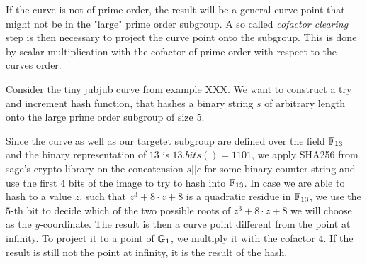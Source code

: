 If the curve is not of prime order, the result will be a general curve point that might not be in the "large" prime order subgroup. A so called \textit{cofactor clearing} step is then necessary to project the curve point onto the subgroup. This is done by scalar multiplication with the cofactor of prime order with respect to the curves order.
\begin{example} Consider the tiny jubjub curve from example XXX. We want to construct a try and increment hash function, that hashes a binary string $s$ of arbitrary length onto the large prime order subgroup of size $5$.

Since the curve as well as our targetet subgroup are defined over the field $\mathbb{F}_{13}$ and the binary representation of $13$ is $13.bits()=1101$, we apply SHA256 from sage's crypto library on the concatension $s||c$ for some binary counter string and use the first $4$ bits of the image to try to hash into $\mathbb{F}_{13}$. In case we are able to hash to a value $z$, such that $z^3 +8\cdot z + 8$ is a quadratic residue in $\mathbb{F}_{13}$, we use the $5$-th bit to decide which of the two possible roots of $z^3 + 8\cdot z + 8$ we will choose as the $y$-coordinate. The result is then a curve point different from the point at infinity. To project it to a point of $\mathbb{G}_1$, we multiply it with the cofactor $4$. If the result is still not the point at infinity, it is the result of the hash.


\end{example}
